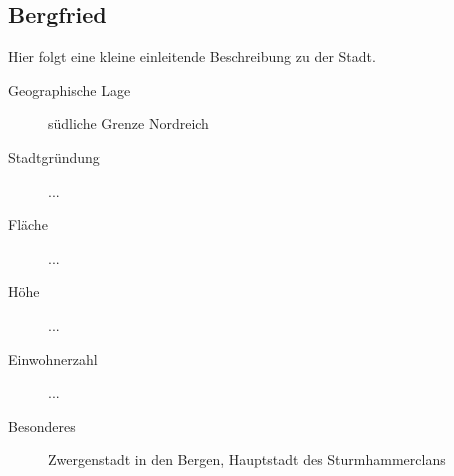 \subsection{Bergfried}
\par Hier folgt eine kleine einleitende Beschreibung zu der Stadt.

\begin{description}
\item [Geographische Lage] südliche Grenze Nordreich
\item [Stadtgründung] ...
\item [Fläche] ...
\item [Höhe] ...
\item [Einwohnerzahl] ...
\item [Besonderes] Zwergenstadt in den Bergen, Hauptstadt des Sturmhammerclans
\end{description}